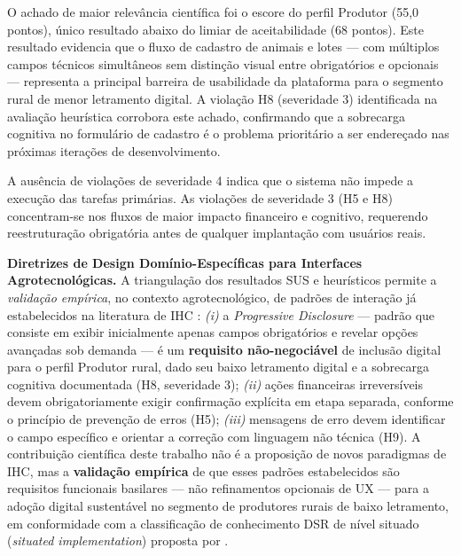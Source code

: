 \documentclass[12pt]{article}
\begin{document}
O achado de maior relevância científica foi o escore do perfil Produtor (55,0 pontos),
único resultado abaixo do limiar de aceitabilidade (68 pontos). Este resultado evidencia
que o fluxo de cadastro de animais e lotes --- com múltiplos campos técnicos simultâneos
sem distinção visual entre obrigatórios e opcionais --- representa a principal barreira
de usabilidade da plataforma para o segmento rural de menor letramento digital. A
violação H8 (severidade 3) identificada na avaliação heurística corrobora este achado,
confirmando que a sobrecarga cognitiva no formulário de cadastro é o problema
prioritário a ser endereçado nas próximas iterações de desenvolvimento.

A ausência de violações de severidade 4 indica que o sistema não impede a execução
das tarefas primárias. As violações de severidade 3 (H5 e H8) concentram-se nos fluxos
de maior impacto financeiro e cognitivo, requerendo reestruturação obrigatória antes de
qualquer implantação com usuários reais.

\textbf{Diretrizes de Design Domínio-Específicas para Interfaces Agrotecnológicas.}
A triangulação dos resultados SUS e heurísticos permite a \textit{validação empírica},
no contexto agrotecnológico, de padrões de interação já estabelecidos na literatura de
IHC \cite{tidwell2011,gregor2013}: \textit{(i)} a \textit{Progressive Disclosure} --- padrão
que consiste em exibir inicialmente apenas campos obrigatórios e revelar opções avançadas
sob demanda \cite{tidwell2011} --- é um \textbf{requisito não-negociável} de inclusão
digital para o perfil Produtor rural, dado seu baixo letramento digital e a sobrecarga
cognitiva documentada (H8, severidade 3); \textit{(ii)} ações financeiras irreversíveis
devem obrigatoriamente exigir confirmação explícita em etapa separada, conforme o
princípio de prevenção de erros (H5); \textit{(iii)} mensagens de erro devem identificar
o campo específico e orientar a correção com linguagem não técnica (H9). A contribuição
científica deste trabalho não é a proposição de novos paradigmas de IHC, mas a
\textbf{validação empírica} de que esses padrões estabelecidos são requisitos funcionais
basilares --- não refinamentos opcionais de UX --- para a adoção digital sustentável no
segmento de produtores rurais de baixo letramento, em conformidade com a classificação
de conhecimento DSR de nível situado (\textit{situated implementation}) proposta por
\cite{gregor2013}.

\end{document}
